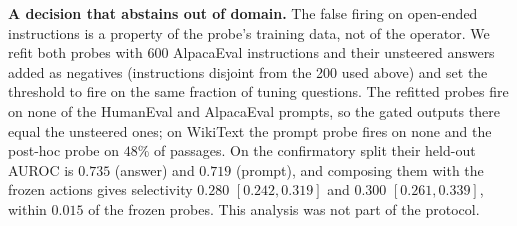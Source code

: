 \begin{table}[h]\footnotesize\setlength{\tabcolsep}{3pt}
\centering
{}
\caption{Capability under the Gemma operators. Intervals are paired bootstrap
intervals over problems.}
\label{tab:capability}
\end{table}

\textbf{A decision that abstains out of domain.} The false firing on
open-ended instructions is a property of the probe's training data, not of the
operator. We refit both probes with 600 AlpacaEval instructions and their
unsteered answers added as negatives (instructions disjoint from the 200 used
above) and set the threshold to fire on the same fraction of tuning questions.
The refitted probes fire on none of the HumanEval and AlpacaEval prompts, so
the gated outputs there equal the unsteered ones; on WikiText the prompt probe
fires on none and the post-hoc probe on $48\%$ of passages. On the
confirmatory split their held-out AUROC is $0.735$ (answer) and $0.719$
(prompt), and composing them with the frozen actions gives selectivity $0.280$
$[0.242, 0.319]$ and $0.300$ $[0.261, 0.339]$, within $0.015$ of the frozen
probes. This analysis was not part of the protocol.

